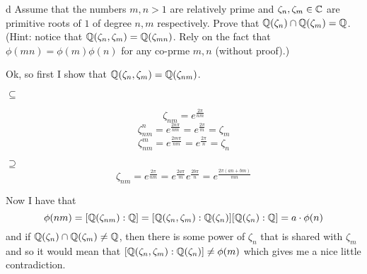 \documentclass{article}
\begin{document}
\begin{problem}[11]{d}
Assume that the numbers $m,n>1$ are relatively prime and $\zeta_n,\zeta_m\in\mathbb{C}$ are primitive roots of $1$ of degree $n,m$ respectively. Prove that $\mathbb{Q}(\zeta_n)\cap\mathbb{Q}(\zeta_m)=\mathbb{Q}$. (Hint: notice that $\mathbb{Q}(\zeta_n,\zeta_m)=\mathbb{Q}(\zeta_{mn})$. Rely on the fact that $\phi(mn)=\phi(m)\phi(n)$ for any co-prme $m,n$ (without proof).)
\end{problem}

Ok, so first I show that $\mathbb{Q}(\zeta_n,\zeta_m)=\mathbb{Q}(\zeta_{nm})$.

$\subseteq$

$$\zeta_{nm}=e^{\frac{2\pi}{nm}}$$
$$\zeta_{nm}^n=e^{\frac{2n\pi}{nm}}=e^{\frac{2\pi}{m}}=\zeta_m$$
$$\zeta_{nm}^m=e^{\frac{2m\pi}{nm}}=e^{\frac{2\pi}{n}}=\zeta_n$$

$\supseteq$
$$\zeta_{nm}=e^{\frac{2\pi}{nm}}=e^{\frac{2a\pi}{m}}e^{\frac{2b\pi}{n}}=e^{\frac{2\pi(an+bm)}{mn}}$$



Now I have that
$$\phi(nm)=[\mathbb{Q}(\zeta_{nm}):\mathbb{Q}]=[\mathbb{Q}(\zeta_n,\zeta_m):\mathbb{Q}(\zeta_n)][\mathbb{Q}(\zeta_n):\mathbb{Q}]=a\cdot \phi(n)$$
and if $\mathbb{Q}(\zeta_n)\cap\mathbb{Q}(\zeta_m)\neq\mathbb{Q}$, then there is some power of $\zeta_n$ that is shared with $\zeta_m$ and so it would mean that $[\mathbb{Q}(\zeta_n,\zeta_m):\mathbb{Q}(\zeta_n)]\neq\phi(m)$ which gives me a nice little contradiction.
\end{document}
